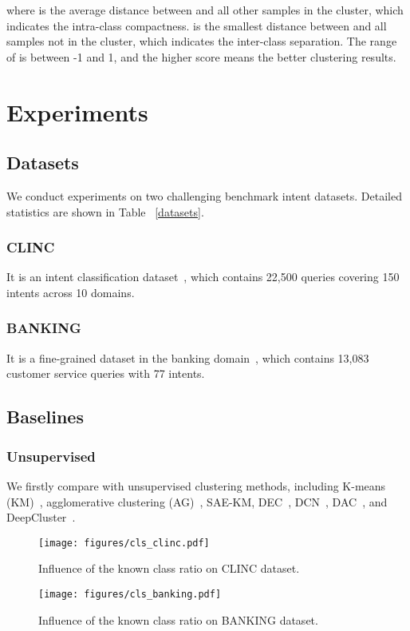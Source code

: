 \documentclass[letterpaper]{article} \usepackage{aaai21}  \usepackage{times}  \usepackage{helvet} \usepackage{courier}  \usepackage[hyphens]{url}  \usepackage{graphicx} \urlstyle{rm} \def\UrlFont{\rm}  \usepackage{natbib}  \usepackage{caption} \frenchspacing  \setlength{\pdfpagewidth}{8.5in}  \setlength{\pdfpageheight}{11in}  \usepackage{amsmath}
\begin{document}
	where  is the average distance between  and all other samples in the  cluster, which indicates the intra-class compactness.  is the smallest distance between  and all samples not in the  cluster, which indicates the inter-class separation. The range of  is between -1 and 1, and the higher score means the better clustering results.
	
	
	
	
	\section{Experiments}
	
	\subsection{Datasets}
	We conduct experiments on two challenging benchmark intent datasets. Detailed statistics are shown in Table ~\ref{datasets}.
	\subsubsection{CLINC} It is an intent classification dataset~\cite{larson-etal-2019-evaluation}, which contains 22,500 queries covering 150 intents across 10 domains.
	\subsubsection{BANKING} It is a fine-grained dataset in the banking domain~\cite{Casanueva2020}, which contains 13,083 customer service queries with 77 intents.
	\subsection{Baselines}
	\subsubsection{Unsupervised}
	We firstly compare with unsupervised clustering methods, including K-means (KM)~\cite{macqueen1967some}, agglomerative clustering (AG)~\cite{gowda1978agglomerative}, SAE-KM, DEC~\cite{xie2016unsupervised}, DCN~\cite{yang2017towards}, DAC~\cite{chang2017deep}, and DeepCluster~\cite{caron2018deep}.

	\begin{figure*}[t!]
		\centering 
		\texttt{[image: figures/cls\_clinc.pdf]}
		\caption{\label{results-aba-2-1} Influence of the known class ratio on CLINC dataset.}
	\end{figure*}
	\begin{figure*}[t!]
		\centering  
		\texttt{[image: figures/cls\_banking.pdf]}
		\caption{\label{results-aba-2-2} Influence of the known class ratio on BANKING dataset.}
	\end{figure*}
	
\end{document}
